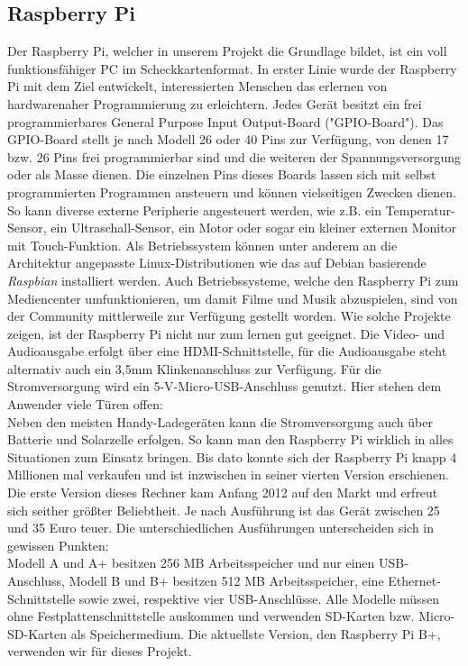 \documentclass[journal]{IEEEtran}
\begin{document}
\subsection{Raspberry Pi}
Der Raspberry Pi, welcher in unserem Projekt die Grundlage bildet, ist ein voll funktionsfähiger PC im Scheckkartenformat. In erster Linie wurde der Raspberry Pi mit dem Ziel entwickelt, interessierten Menschen das erlernen von hardwarenaher Programmierung zu erleichtern. Jedes Gerät besitzt ein frei programmierbares General Purpose Input Output-Board ("GPIO-Board"). Das GPIO-Board stellt je nach Modell 26 oder 40 Pins zur Verfügung, von denen 17 bzw. 26 Pins frei programmierbar sind und die weiteren der Spannungsversorgung oder als Masse dienen. Die einzelnen Pins dieses Boards lassen sich mit selbst programmierten Programmen ansteuern und können vielseitigen Zwecken dienen. So kann diverse externe Peripherie angesteuert werden, wie z.B. ein Temperatur-Sensor, ein Ultraschall-Sensor, ein Motor oder sogar ein kleiner externen Monitor mit Touch-Funktion. Als Betriebssystem können unter anderem an die Architektur angepasste Linux-Distributionen wie das auf Debian basierende \textit{Raspbian} installiert werden.  Auch Betriebssysteme, welche den Raspberry Pi zum Mediencenter umfunktionieren, um damit Filme und Musik abzuspielen, sind von der Community mittlerweile zur Verfügung gestellt worden. Wie solche Projekte zeigen, ist der Raspberry Pi nicht nur zum lernen gut geeignet. Die Video- und Audioausgabe erfolgt über eine HDMI-Schnittstelle, für die Audioausgabe steht alternativ auch ein 3,5mm Klinkenanschluss zur Verfügung. Für die Stromversorgung wird ein 5-V-Micro-USB-Anschluss genutzt. Hier stehen dem Anwender viele Türen offen: \\ Neben den meisten Handy-Ladegeräten kann die Stromversorgung auch über Batterie und Solarzelle erfolgen. So kann man den Raspberry Pi wirklich in alles Situationen zum Einsatz bringen. Bis dato konnte sich der Raspberry Pi knapp 4 Millionen mal verkaufen und ist inzwischen in seiner vierten Version erschienen. \cite{verkaufszahlen} Die erste Version dieses Rechner kam Anfang 2012 auf den Markt und erfreut sich seither größter Beliebtheit. Je nach Ausführung ist das Gerät zwischen 25 und 35 Euro teuer. Die unterschiedlichen Ausführungen unterscheiden sich in gewissen Punkten: \\ Modell A und A+ besitzen 256 MB Arbeitsspeicher und nur einen USB-Anschluss, Modell B und B+ besitzen 512 MB Arbeitsspeicher, eine Ethernet-Schnittstelle sowie zwei, respektive vier USB-Anschlüsse. Alle Modelle müssen ohne Festplattenschnittstelle auskommen und verwenden SD-Karten  bzw. Micro-SD-Karten als Speichermedium. Die aktuellste Version, den Raspberry Pi B+, verwenden wir für dieses Projekt.\\
\end{document}
